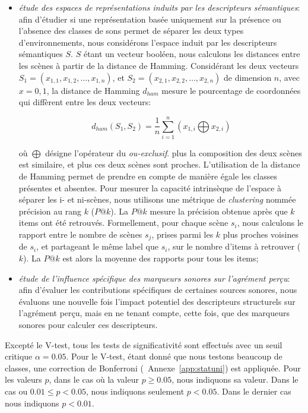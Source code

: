 \begin{itemize}
\item \emph{étude des espaces de représentations induits par les descripteurs sémantiques}: afin d'étudier si une représentation basée uniquement sur la présence ou l'absence des classes de sons permet de séparer les deux types d'environnements, nous considérons l'espace induit par les descripteurs sémantiques $S$. $S$ étant un vecteur booléen, nous calculons les distances entre les scènes à partir de la distance de Hamming. Considérant les deux vecteurs $S_1=(x_{1,1},x_{1,2},\ldots,x_{1,n})$, et $S_2=(x_{2,1},x_{2,2},\ldots,x_{2,n})$ de dimension $n$, avec $x={0,1}$, la distance de Hamming $d_{ham}$ mesure le pourcentage de coordonnées qui diffèrent entre les deux vecteurs:   


\begin{equation*}
d_{ham}(S_1,S_2)=\dfrac{1}{n}\sum_{i=1}^{n} (x_{1,i} \bigoplus x_{2,i})
\end{equation*}

où $\bigoplus$ désigne l'opérateur du \emph{ou-exclusif}. plus la composition des deux scènes est similaire, et plus ces deux scènes sont proches. L'utilisation de la distance de Hamming permet de prendre en compte de manière égale les classes présentes et absentes. Pour mesurer la capacité intrinsèque de l'espace à séparer les i- et ni-scènes, nous utilisons une métrique de \emph{clustering} nommée précision au rang $k$ ($P@k$). La $P@k$ mesure la précision obtenue après que $k$ items ont été retrouvés. Formellement, pour chaque scène $s_i$, nous calculons le rapport entre le nombre de scènes $s_j$, prises parmi les $k$ plus proches voisines de $s_i$, et  partageant le même label que $s_i$, sur le nombre d'items à retrouver ($k$). La $P@k$ est alors la moyenne des rapports pour tous les items;

\item \emph{étude de l'influence spécifique des marqueurs sonores sur l'agrément perçu}: afin d'évaluer les contributions spécifiques de certaines sources sonores, nous évaluons une nouvelle fois l'impact potentiel des descripteurs structurels sur l'agrément perçu, mais en ne tenant compte, cette fois, que des marqueurs sonores pour calculer ces descripteurs.
\end{itemize}

Excepté le V-test, tous les tests de significativité sont effectués avec un seuil critique $\alpha=0.05$. Pour le V-test, étant donné que nous testons beaucoup de classes, une correction de Bonferroni (\cf~Annexe~\ref{app:statuni}) est appliquée. Pour les valeurs $p$, dans le cas où la valeur $p\geq0.05$, nous indiquons sa valeur. Dans le cas ou $0.01\leq p<0.05$, nous indiquons seulement $p<0.05$. Dans le dernier cas nous indiquons $p<0.01$.

